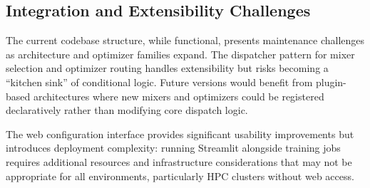 \subsection{Integration and Extensibility Challenges}

The current codebase structure, while functional, presents maintenance challenges as architecture and optimizer families expand. The dispatcher pattern for mixer selection and optimizer routing handles extensibility but risks becoming a ``kitchen sink'' of conditional logic. Future versions would benefit from plugin-based architectures where new mixers and optimizers could be registered declaratively rather than modifying core dispatch logic.

The web configuration interface provides significant usability improvements but introduces deployment complexity: running Streamlit alongside training jobs requires additional resources and infrastructure considerations that may not be appropriate for all environments, particularly HPC clusters without web access.

